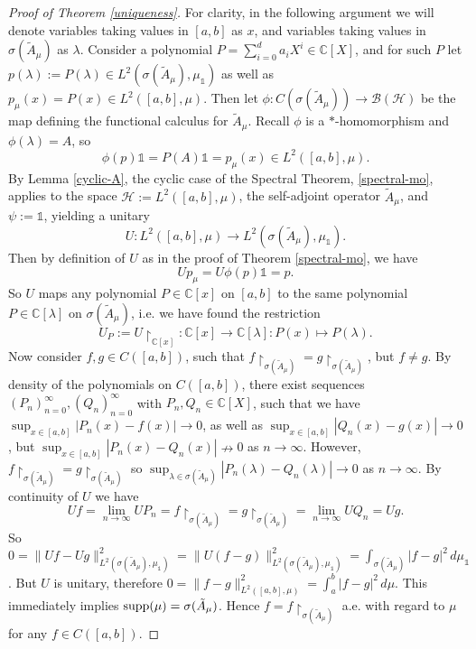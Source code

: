\documentclass[12pt,oneside]{report}
\begin{document}
\begin{proof}[Proof of Theorem \ref{uniqueness}]
    For clarity, in the following argument we will denote variables taking values in $[a,b]$ as $x$, and variables taking values in $\sigma(\tilde{A}_{\mu})$ as $\lambda$.
    Consider a polynomial $P = \sum_{i=0}^{d}a_{i}X^{i} \in \mathbb{C}[X]$, and for such $P$ let $p(\lambda) := P(\lambda) \in L^{2}(\sigma(\tilde{A}_{\mu}), \mu_{\mathds{1}})$ as well as $p_{\mu}(x) = P(x) \in L^{2}([a,b],\mu)$.
    Then let $\phi: C(\sigma(\tilde{A}_\mu)) \to \mathscr{B}(\mathscr{H})$ be the map defining the functional calculus for $\tilde{A}_{\mu}$. Recall $\phi$ is a $*$-homomorphism and $\phi(\lambda) = A$, so
    $$\phi(p)\mathds{1} = P(A)\mathds{1} = p_{\mu}(x) \in L^{2}([a,b], \mu).$$
    By Lemma \ref{cyclic-A}, the cyclic case of the Spectral Theorem, \ref{spectral-mo}, applies to the space $\mathscr{H} := L^{2}([a,b],\mu)$, the self-adjoint operator $\tilde{A}_{\mu}$, and $\psi := \mathds{1}$, yielding a unitary
    $$U: L^{2}([a,b],\mu) \to L^{2}(\sigma(\tilde{A}_{\mu}),\mu_{\mathds{1}}).$$
    Then by definition of $U$ as in the proof of Theorem \ref{spectral-mo}, we have
    $$Up_{\mu} = U\phi(p)\mathds{1} = p.$$
    So $U$ maps any polynomial $P \in \mathbb{C}[x]$ on $[a,b]$ to the same polynomial $P \in \mathbb{C}[\lambda]$ on $\sigma(\tilde{A}_{\mu})$, i.e. we have found the restriction
    $$U_{P} := U \restriction_{\mathbb{C}[x]}: \mathbb{C}[x] \to \mathbb{C}[\lambda]: P(x) \mapsto P(\lambda).$$
    Now consider $f,g \in C([a,b])$, such that $f \restriction_{\sigma(\tilde{A}_\mu)} = g \restriction_{\sigma(\tilde{A}_\mu)}$, but $f \neq g$. By density of the polynomials on $C([a,b])$, there exist sequences $(P_n)_{n=0}^\infty, (Q_n)_{n=0}^\infty$ with $P_n, Q_n \in \mathbb{C}[X]$, such that we have $\sup_{x \in [a,b]}|P_n(x) - f(x)| \to 0$, as well as $\sup_{x \in [a,b]}|Q_n(x) - g(x)| \to 0$, but $\sup_{x \in [a,b]}|P_n(x) - Q_n(x)| \nrightarrow 0$ as $n \to \infty$. However, $f \restriction_{\sigma(\tilde{A}_\mu)} = g \restriction_{\sigma(\tilde{A}_\mu)}$ so $\sup_{\lambda \in \sigma(\tilde{A}_\mu)}|P_n(\lambda) - Q_n(\lambda)| \to 0$ as $n \to \infty$. By continuity of $U$ we have
    $$Uf = \lim_{n \to \infty} UP_n = f \restriction_{\sigma(\tilde{A}_\mu)} = g \restriction_{\sigma(\tilde{A}_\mu)} = \lim_{n \to \infty} UQ_n = Ug.$$
    So $0 = \|Uf - Ug\|_{L^{2}(\sigma(\tilde{A}_{\mu}),\mu_{\mathds{1}})}^2 = \|U(f-g)\|_{L^{2}(\sigma(\tilde{A}_{\mu}),\mu_{\mathds{1}})}^2 = \int_{\sigma(\tilde{A}_\mu)} |f - g|^2 \, d\mu_\mathds{1}$.
    But $U$ is unitary, therefore $0 = \|f-g\|_{L^{2}([a,b],\mu)}^2 = \int_a^b |f - g|^2 \, d\mu$.
    This immediately implies $\mathrm{supp}(\mu) = \sigma(\tilde{A}_\mu)$.
    Hence $f = f \restriction_{\sigma(\tilde{A}_{\mu})}$ a.e. with regard to $\mu$ for any $f \in C([a,b])$.


\end{proof}
\end{document}
